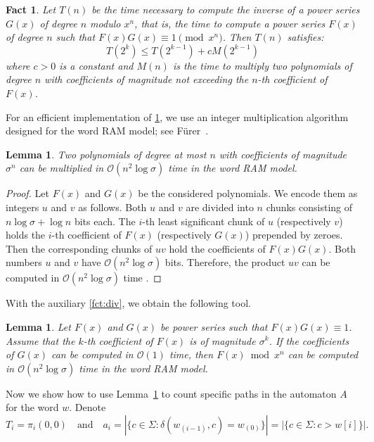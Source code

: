 \documentclass{article}
\newcommand{\mayqed}{}
\newcommand{\Oh}{\mathcal{O}}
\newtheorem{lemma}[theorem]{Lemma}
\newtheorem{fact}[theorem]{Fact}
\theoremstyle{definition}
\theoremstyle{remark}
\begin{document}
\begin{fact}\label{fct:reciprocal}
  Let $T(n)$ be the time necessary to compute the inverse of a power series $G(x)$ of degree $n$ modulo $x^n$,
  that is, the time to compute a power series $F(x)$ of degree $n$ such that $F(x)G(x) \equiv 1 \pmod{x^n}$.
  Then $T(n)$ satisfies:
  $$T(2^k) \le T(2^{k-1})+cM(2^{k-1})$$
  where $c>0$ is a constant and $M(n)$ is the time to multiply two polynomials of degree $n$
  with coefficients of magnitude not exceeding the $n$-th coefficient of $F(x)$.
\end{fact}

\noindent
For an efficient implementation of \cref{fct:reciprocal}, we use an integer multiplication algorithm
designed for the word RAM model; see F\"urer~\cite{DBLP:conf/latin/Furer14a}.

\begin{lemma}\label{lem:multiply}
  Two polynomials of degree at most $n$ with coefficients of magnitude $\sigma^n$
  can be multiplied in $\Oh(n^2 \log \sigma)$ time in the word RAM model.
\end{lemma}
\begin{proof}
  Let $F(x)$ and $G(x)$ be the considered polynomials.
  We encode them as integers $u$ and $v$ as follows.
  Both $u$ and $v$ are divided into $n$ chunks consisting of $n \log \sigma + \log n$ bits each.
  The $i$-th least significant chunk of $u$ (respectively $v$) holds the $i$-th coefficient of $F(x)$ (respectively $G(x)$)
  prepended by zeroes.
  Then the corresponding chunks of $uv$ hold the coefficients of $F(x)G(x)$.
  Both numbers $u$ and $v$ have $\Oh(n^2 \log \sigma)$ bits.
  Therefore, the product $uv$ can be computed in $\Oh(n^2 \log \sigma)$ time \cite{DBLP:conf/latin/Furer14a}.
\mayqed\end{proof}

\noindent
With the auxiliary \cref{fct:div}, we obtain the following tool.

\begin{lemma}\label{lem:generating}
  Let $F(x)$ and $G(x)$ be power series such that $F(x) G(x) \equiv 1$.
  Assume that the $k$-th coefficient of $F(x)$ is of magnitude $\sigma^k$.
  If the coefficients of $G(x)$ can be computed in $\Oh(1)$ time,
  then $F(x) \bmod x^n$ can be computed in $\Oh(n^2 \log \sigma)$ time
  in the word RAM model.
\end{lemma}

Now we show how to use Lemma~\ref{lem:generating} to count specific paths in
the automaton $A$ for the word $w$.
Denote
$$T_i = \pi_i(0,0) \quad\mbox{and}\quad a_i = |\{c\in \Sigma : \delta(w_{(i-1)}, c) = w_{(0)}\}|=|\{ c \in \Sigma: c > w[i]\}|.$$
\end{document}
